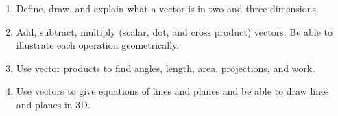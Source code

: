 
\begin{enumerate}
\item Define, draw, and explain what a vector is in two and three
  dimensions.
\item Add, subtract, multiply (scalar, dot, and cross product)
  vectors. Be able to illustrate each operation geometrically.
\item Use vector products to find angles, length, area, projections,
  and work.
\item Use vectors to give equations of lines and planes and be able to
  draw lines and planes in 3D.
\end{enumerate}



